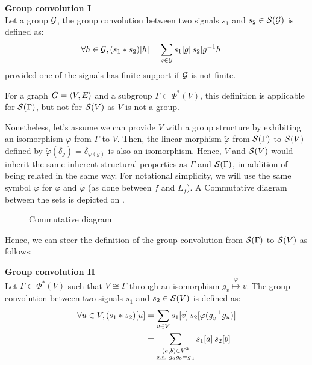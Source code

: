 \begin{definition}\textbf{Group convolution I}\\
Let a group $\group$, the group convolution between two signals $s_1$ and $s_2 \in \cs(\group)$ is defined as:
\begin{align*}
\forall h \in \group, (s_1 \ast s_2)[h] & = \displaystyle \sum_{g \in \group} s_1[g] \h{2} s_2[g^{-1}h]%
\end{align*}
provided one of the signals has finite support if $\group$ is not finite.
\label{def:conv1}
\end{definition}

For a graph $\gve$ and a subgroup $\Gamma \subset \Phi^*(V)$, this definition is applicable for $\cs(\Gamma)$, but not for $\cs(V)$ as $V$ is not a group.

Nonetheless, let's assume we can provide $V$ with a group structure by exhibiting an isomorphism $\varphi$ from $\Gamma$ to $V$. Then, the linear morphism $\widetilde\varphi$ from $\cs(\Gamma)$ to $\cs(V)$ defined by $\widetilde\varphi(\delta_g) = \delta_{\varphi(g)}$ is also an isomorphism. Hence, $V$ and $\cs(V)$ would inherit the same inherent structural properties as $\Gamma$ and $\cs(\Gamma)$, in addition of being related in the same way. For notational simplicity, we will use the same symbol $\varphi$ for $\varphi$ and $\widetilde\varphi$ (as done between $f$ and $L_f$). A Commutative diagram between the sets is depicted on .

\begin{figure}[H]
\centering
{}%
\caption{Commutative diagram}
\label{fig:iso}
\end{figure}

Hence, we can steer the definition of the group convolution from $\cs(\Gamma)$ to $\cs(V)$ as follows:

\begin{definition}\textbf{Group convolution II}\\
Let $\Gamma \subset \Phi^*(V)$ such that $V \cong \Gamma$ through an isomorphism $g_v \overset{\varphi}\mapsto v$.
The group convolution between two signals $s_1$ and $s_2 \in \cs(V)$ is defined as:
\begin{align*}
\forall u \in V, (s_1 \ast s_2) [u] & = \displaystyle \sum_{v \in V} s_1[v] \h{2} s_2[\varphi(g_v^{-1}g_u)]\\
& = \displaystyle \sum_{\substack{(a,b) \in V^2 \\ \st g_ag_b=g_u }} s_1[a] \h{2} s_2[b]
\end{align*}
\label{def:conv2}
\end{definition}

